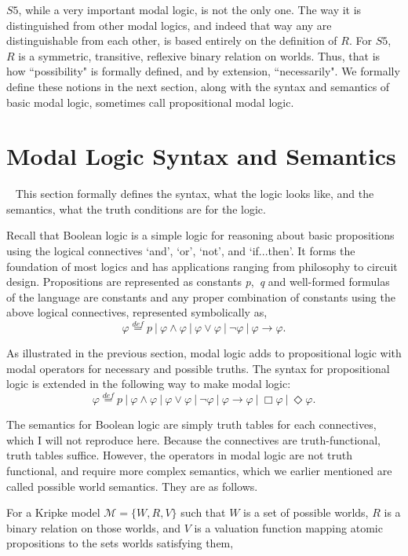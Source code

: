 $\mathit{S5}$, while a very important modal logic, is not the only one. The way it is distinguished from other modal logics, and indeed that way any are distinguishable from each other, is based entirely on the definition of $R$. For $\mathit{S5}$, $R$ is a symmetric, transitive, reflexive binary relation on worlds. Thus, that is how ``possibility" is formally defined, and by extension, ``necessarily". We formally define these notions in the next section, along with the syntax and semantics of basic modal logic, sometimes call propositional modal logic.

\section{Modal Logic Syntax and Semantics}~\label{molo_syn_sem}
This section formally defines the syntax, what the logic looks like, and the semantics, what the truth conditions are for the logic.

Recall that Boolean logic is a simple logic for reasoning about basic propositions using the logical connectives `and', `or', `not', and `if...then'. It forms the foundation of most logics and has applications ranging from philosophy to circuit design. Propositions are represented as constants {\emph p,\ \emph q} and well-formed formulas of the language are constants and any proper combination of constants using the above logical connectives, represented symbolically as,
$$\varphi \stackrel{def}{=} p\  |\  \varphi \wedge \varphi\  |\  \varphi \vee \varphi\  |\ \neg \varphi \ |\   \varphi \rightarrow \varphi. 
$$

As illustrated in the previous section, modal logic adds to propositional logic with modal operators for necessary and possible truths. The syntax for propositional logic is extended in the following way to make modal logic:
$$\varphi \stackrel{def}{=} p\  |\  \varphi \wedge \varphi\  |\  \varphi \vee \varphi\  |\ \neg \varphi \ |\   \varphi \rightarrow \varphi\ |\ \Box \varphi \ |\ \Diamond \varphi. 
$$

The semantics for Boolean logic are simply truth tables for each connectives, which I will not reproduce here. Because the connectives are truth-functional, truth tables suffice. However, the operators in modal logic are not truth functional, and require more complex semantics, which we earlier mentioned are called possible world semantics. They are as follows.

For a Kripke model $\mathcal{M} = \{W, R, V\}$ such that $W$ is a set of possible worlds, $R$ is a binary relation on those worlds, and $V$ is a valuation function mapping atomic propositions to the sets worlds satisfying them,  


